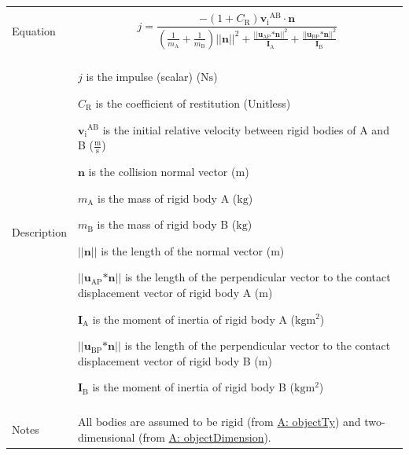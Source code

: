\documentclass[12pt]{article}
\begin{document}
\begin{minipage}{\textwidth}
\begin{tabular}{>{\raggedright}p{}>{\raggedright\arraybackslash}p{}}
\\ \midrule \\
Equation & \begin{displaymath}
           j=\frac{-\left(1+{C_{\text{R}}}\right) {{\mathbf{v}_{\text{i}}}^{\text{A}\text{B}}}\cdot{}\mathbf{n}}{\left(\frac{1}{{m_{\text{A}}}}+\frac{1}{{m_{\text{B}}}}\right) \text{||}\mathbf{n}\text{||}^{2}+\frac{\text{||}{\mathbf{u}_{\text{A}\text{P}}}\text{*}\mathbf{n}\text{||}^{2}}{{\mathbf{I}_{\text{A}}}}+\frac{\text{||}{\mathbf{u}_{\text{B}\text{P}}}\text{*}\mathbf{n}\text{||}^{2}}{{\mathbf{I}_{\text{B}}}}}
           \end{displaymath}
\\ \midrule \\
Description & \begin{symbDescription}
              \item{$j$ is the impulse (scalar) ($\text{N}\text{s}$)}
              \item{${C_{\text{R}}}$ is the coefficient of restitution (Unitless)}
              \item{${{\mathbf{v}_{\text{i}}}^{\text{A}\text{B}}}$ is the initial relative velocity between rigid bodies of A and B ($\frac{\text{m}}{\text{s}}$)}
              \item{$\mathbf{n}$ is the collision normal vector (${\text{m}}$)}
              \item{${m_{\text{A}}}$ is the mass of rigid body A (${\text{kg}}$)}
              \item{${m_{\text{B}}}$ is the mass of rigid body B (${\text{kg}}$)}
              \item{$\text{||}\mathbf{n}\text{||}$ is the length of the normal vector (${\text{m}}$)}
              \item{$\text{||}{\mathbf{u}_{\text{A}\text{P}}}\text{*}\mathbf{n}\text{||}$ is the length of the perpendicular vector to the contact displacement vector of rigid body A (${\text{m}}$)}
              \item{${\mathbf{I}_{\text{A}}}$ is the moment of inertia of rigid body A ($\text{kg}\text{m}^{2}$)}
              \item{$\text{||}{\mathbf{u}_{\text{B}\text{P}}}\text{*}\mathbf{n}\text{||}$ is the length of the perpendicular vector to the contact displacement vector of rigid body B (${\text{m}}$)}
              \item{${\mathbf{I}_{\text{B}}}$ is the moment of inertia of rigid body B ($\text{kg}\text{m}^{2}$)}
              \end{symbDescription}
\\ \midrule \\
Notes & All bodies are assumed to be rigid (from \hyperref[assumpOT]{A: objectTy}) and two-dimensional (from \hyperref[assumpOD]{A: objectDimension}).
        

\end{tabular}
\end{minipage}
\end{document}
